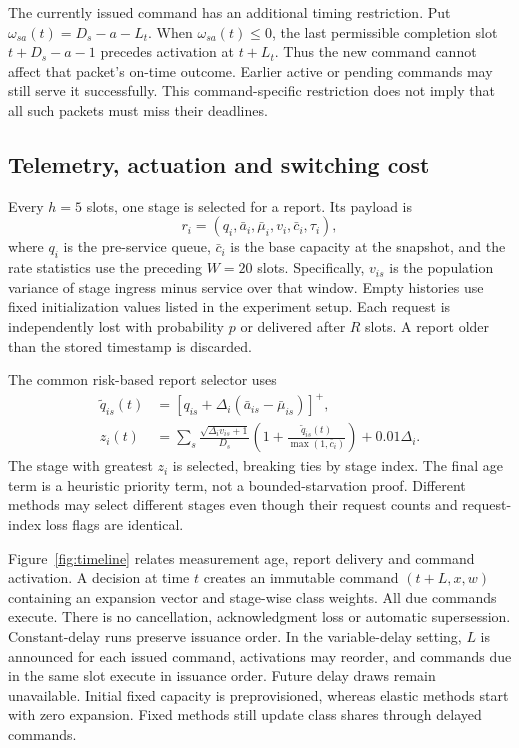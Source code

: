 \documentclass{IEEEoj}
\newcommand{\pos}[1]{\left[#1\right]^+}
\begin{document}
The currently issued command has an additional timing restriction. Put
$\omega_{sa}(t)=D_s-a-L_t$. When $\omega_{sa}(t)\le0$, the last permissible
completion slot $t+D_s-a-1$ precedes activation at $t+L_t$. Thus the new
command cannot affect that packet's on-time outcome. Earlier active or pending
commands may still serve it successfully. This command-specific restriction
does not imply that all such packets must miss their deadlines.

\subsection{Telemetry, actuation and switching cost}
Every $h=5$ slots, one stage is selected for a report. Its payload is
\begin{equation}
 r_i=(q_i,\bar a_i,\bar\mu_i,v_i,\bar c_i,\tau_i),
\end{equation}
where $q_i$ is the pre-service queue, $\bar c_i$ is the base capacity at the
snapshot, and the rate statistics use the preceding $W=20$ slots.
Specifically, $v_{is}$ is the population variance of stage ingress minus service
over that window. Empty histories use fixed initialization values listed in the
experiment setup. Each request is independently lost with probability $p$ or
delivered after $R$ slots. A report older than the stored timestamp is discarded.

The common risk-based report selector uses
\begin{align}
 \widetilde q_{is}(t)&=\pos{q_{is}+\Delta_i(\bar a_{is}-\bar\mu_{is})},\\
 z_i(t)&=\sum_s\frac{\sqrt{\Delta_i v_{is}+1}}{D_s}
 \left(1+\frac{\widetilde q_{is}(t)}{\max(1,\bar c_i)}\right)+0.01\Delta_i.
\end{align}
The stage with greatest $z_i$ is selected, breaking ties by stage index.
The final age term is a heuristic priority term, not a bounded-starvation proof.
Different methods may select different stages even though their request counts
and request-index loss flags are identical.

Figure~\ref{fig:timeline} relates measurement age, report delivery and command activation. A decision at time $t$ creates an immutable command $(t+L,x,w)$ containing an
expansion vector and stage-wise class weights. All due commands execute. There
is no cancellation, acknowledgment loss or automatic supersession. Constant-delay
runs preserve issuance order. In the variable-delay setting, $L$ is announced
for each issued command, activations may reorder, and commands due in the
same slot execute in issuance order. Future delay draws remain unavailable.
Initial fixed capacity is preprovisioned, whereas elastic methods start with
zero expansion. Fixed methods still update class shares through delayed commands.
\end{document}
